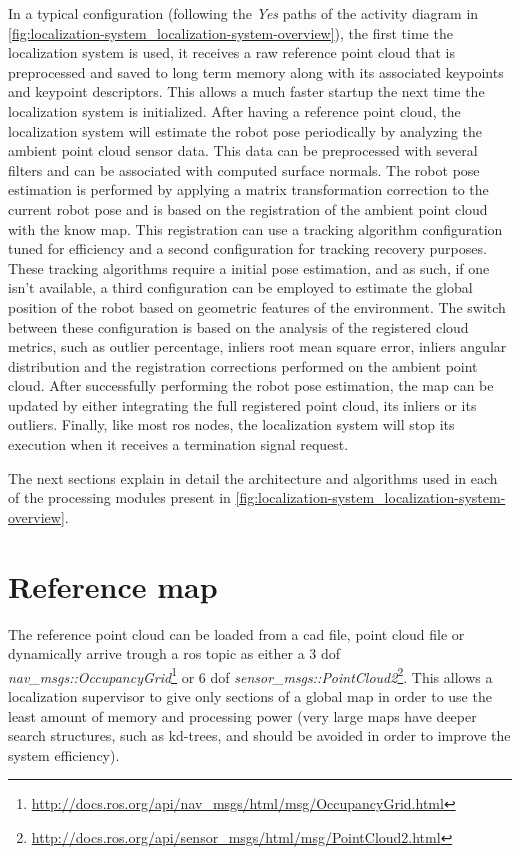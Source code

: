 In a typical configuration (following the \emph{Yes} paths of the activity diagram in \cref{fig:localization-system_localization-system-overview}), the first time the localization system is used, it receives a raw reference point cloud that is preprocessed and saved to long term memory along with its associated keypoints and keypoint descriptors. This allows a much faster startup the next time the localization system is initialized. After having a reference point cloud, the localization system will estimate the robot pose periodically by analyzing the ambient point cloud sensor data. This data can be preprocessed with several filters and can be associated with computed surface normals. The robot pose estimation is performed by applying a matrix transformation correction to the current robot pose and is based on the registration of the ambient point cloud with the know map. This registration can use a tracking algorithm configuration tuned for efficiency and a second configuration for tracking recovery purposes. These tracking algorithms require a initial pose estimation, and as such, if one isn't available, a third configuration can be employed to estimate the global position of the robot based on geometric features of the environment. The switch between these configuration is based on the analysis of the registered cloud metrics, such as outlier percentage, inliers root mean square error, inliers angular distribution and the registration corrections performed on the ambient point cloud. After successfully performing the robot pose estimation, the map can be updated by either integrating the full registered point cloud, its inliers or its outliers. Finally, like most \gls{ros} nodes, the localization system will stop its execution when it receives a termination signal request.

The next sections explain in detail the architecture and algorithms used in each of the processing modules present in \cref{fig:localization-system_localization-system-overview}.



\section{Reference map}

The reference point cloud can be loaded from a \gls{cad} file, point cloud file or dynamically arrive trough a \gls{ros} topic as either a 3 \gls{dof} \emph{nav\_msgs::OccupancyGrid}\footnote{\url{http://docs.ros.org/api/nav_msgs/html/msg/OccupancyGrid.html}} or 6 \gls{dof} \emph{sensor\_msgs::PointCloud2}\footnote{\url{http://docs.ros.org/api/sensor_msgs/html/msg/PointCloud2.html}}. This allows a localization supervisor to give only sections of a global map in order to use the least amount of memory and processing power (very large maps have deeper search structures, such as kd-trees, and should be avoided in order to improve the system efficiency).



